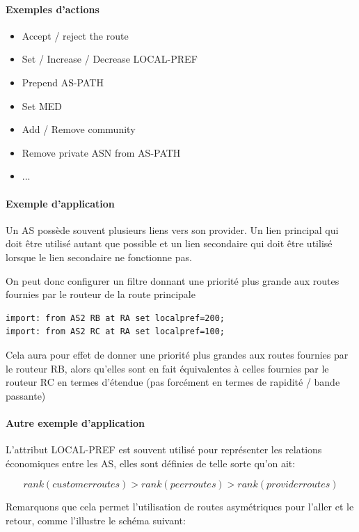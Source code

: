 \documentclass{report}
\begin{document}
\paragraph{Exemples d'actions}

\begin{itemize}
\item Accept / reject the route
\item Set / Increase / Decrease LOCAL-PREF
\item Prepend AS-PATH
\item Set MED
\item Add / Remove community
\item Remove private ASN from AS-PATH
\item ...
\end{itemize}

\paragraph{Exemple d'application}

Un AS possède souvent plusieurs liens vers son provider. Un lien
principal qui doit être utilisé autant que possible et un lien
secondaire qui doit être utilisé lorsque le lien secondaire ne
fonctionne pas.

On peut donc configurer un filtre donnant une priorité plus grande aux
routes fournies par le routeur de la route principale

\begin{verbatim}
import: from AS2 RB at RA set localpref=200;
import: from AS2 RC at RA set localpref=100;
\end{verbatim}

Cela aura pour effet de donner une priorité plus grandes aux routes
fournies par le routeur RB, alors qu'elles sont en fait équivalentes à
celles fournies par le routeur RC en termes d'étendue (pas forcément
en termes de rapidité / bande passante)

\paragraph{Autre exemple d'application}

L'attribut LOCAL-PREF est souvent utilisé pour représenter les
relations économiques entre les AS, elles sont définies de telle sorte
qu'on ait:

\[rank(customer routes) > rank(peer routes) > rank(provider routes)\]

Remarquons que cela permet l'utilisation de routes asymétriques pour
l'aller et le retour, comme l'illustre le schéma suivant:
\end{document}
